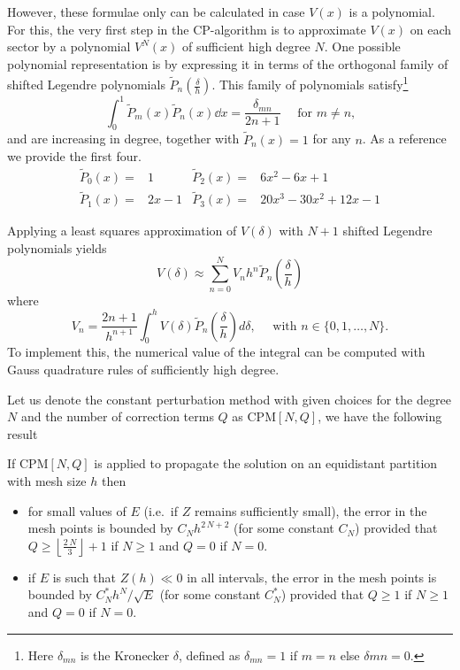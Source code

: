 However, these formulae only can be calculated in case $V(x)$ is a polynomial. For this, the very first step in the CP-algorithm is to approximate $V(x)$ on each sector by a polynomial $V^{N}(x)$ of sufficient high degree $N$. One possible polynomial representation is by expressing it in terms of the orthogonal family of shifted Legendre polynomials $\widetilde{P}_n(\frac{\delta}{h})$. This family of polynomials satisfy\footnote{Here $\delta_{mn}$ is the Kronecker $\delta$, defined as $\delta_{mn} = 1$ if $m=n$ else $\delta{mn} = 0$.}
$$
    \int_0^1 \widetilde{P}_m(x) \widetilde{P}_n(x) \dd x = \frac{\delta_{mn}}{2n + 1} \quad\text{ for $m \neq n$,}
$$
and are increasing in degree, together with $\widetilde{P}_n(x) = 1$ for any $n$. As a reference we provide the first four.
\begin{align*}
    \widetilde{P}_0(x) = & 1      & \widetilde{P}_2(x) = & 6x^2 - 6x + 1             \\
    \widetilde{P}_1(x) = & 2x - 1 & \widetilde{P}_3(x) = & 20 x^3 - 30 x^2 +12 x - 1
\end{align*}

Applying a least squares approximation of $V(\delta)$ with $N + 1$ shifted Legendre polynomials yields
$$
    V(\delta) \approx \sum_{n=0}^N V_n h^n \widetilde{P}_n(\frac{\delta}{h})
$$
where
\begin{equation}\label{equ:c2_legendre_V}
    V_n= \frac{2 n + 1}{h^{n+1}} \int_0^h V(\delta) \widetilde{P}_n(\frac{\delta}{h}) d \delta, \quad \text{ with $n \in \{0, 1,\dots, N\}$.}
\end{equation}
To implement this, the numerical value of the integral can be computed with Gauss quadrature rules of sufficiently high degree.

Let us denote the constant perturbation method with given choices for the degree $N$ and the number of correction terms $Q$ as CPM$[N,Q]$, we have the following result \cite{ixaru_cp_1998}

\begin{theorem}\label{the:c2_h_error_estimate}
    If $\text{CPM}[N,Q]$ is applied to propagate the solution on an equidistant partition with mesh size $h$ then
    \begin{itemize}
        \item for small values of $E$ (i.e.\ if $Z$ remains sufficiently small), the error in the mesh points is bounded by $C_N h^{2\,N+2}$ (for some constant $C_N$) provided that $Q \geq \left\lfloor \frac{2\,N}{3} \right\rfloor +1$ if $N \geq 1$ and $Q=0$ if $N=0$.
        \item if $E$ is such that $Z(h)\ll 0$ in all intervals, the error in the mesh points is bounded by $C^*_N h^{N}/ \sqrt{E}$  (for some constant $C^*_N$) provided that $Q \geq 1$  if $N \geq 1$ and $Q=0$ if $N=0$.
    \end{itemize}
\end{theorem}

